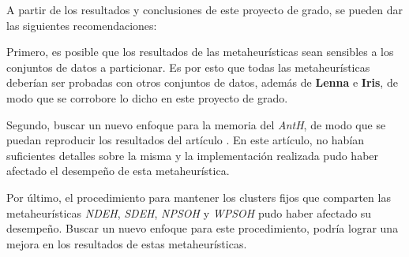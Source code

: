 	A partir de los resultados y conclusiones de este proyecto de grado, se pueden
dar las siguientes recomendaciones:

	Primero, es posible que los resultados de las metaheurísticas sean sensibles
a los conjuntos de datos a particionar. Es por esto que todas las metaheurísticas deberían ser probadas
con otros conjuntos de datos, además de \textbf{Lenna} e \textbf{Iris}, de modo
que se corrobore lo dicho en este proyecto de grado.

	Segundo, buscar un nuevo enfoque para la memoria del \emph{AntH}, de modo que
se puedan reproducir los resultados del artículo \cite{OuBa2007}. En este
artículo, no habían suficientes detalles sobre la misma y la implementación
realizada pudo haber afectado el desempeño de esta metaheurística.

	Por último, el procedimiento para mantener los clusters fijos que comparten
las metaheurísticas \emph{NDEH}, \emph{SDEH}, \emph{NPSOH} y \emph{WPSOH} pudo
haber afectado su desempeño. Buscar un nuevo enfoque para este procedimiento,
podría lograr una mejora en los resultados de estas metaheurísticas.
